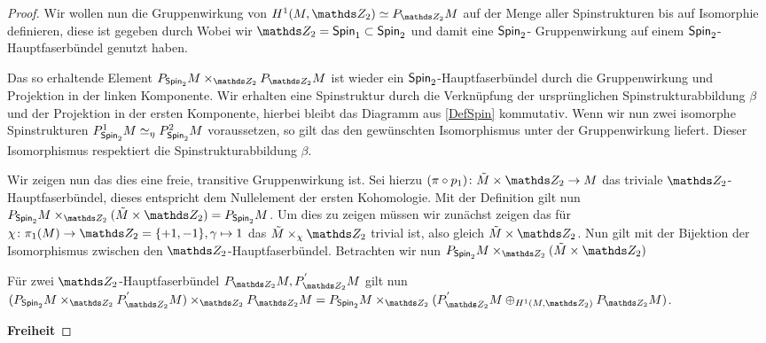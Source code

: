 \begin{Satz}
\begin{proof}
		Wir wollen nun die Gruppenwirkung von $ H^1(M,\Z_2)\simeq \Ph{\Z_2}{M} $ auf der Menge aller Spinstrukturen bis auf Isomorphie definieren,
		diese ist gegeben durch
		Wobei wir $ \Z_2=\spin_1\subset\spin_2 $ und damit eine $ \operatorname{\mathsf{Spin}}_2 $-
		Gruppenwirkung auf einem $ \operatorname{\mathsf{Spin}}_2 $-Hauptfaserbündel genutzt haben.

		Das so erhaltende Element $ \Ph{\spin_2}{M}\times_{\Z_2} \Ph{\Z_2}{M} $ ist wieder ein $ \operatorname{\mathsf{Spin}}_2 $-Hauptfaserbündel
		durch die Gruppenwirkung und Projektion in der linken Komponente. Wir erhalten eine Spinstruktur durch die
		Verknüpfung der ursprünglichen Spinstrukturabbildung $ \beta $
		und der Projektion in der ersten Komponente, hierbei bleibt
		das Diagramm aus \cref{DefSpin} kommutativ.
		Wenn wir nun zwei isomorphe Spinstrukturen $ P^1_{\operatorname{\mathsf{Spin}}_2}{M} \simeq_\eta P^2_{\operatorname{\mathsf{Spin}}_2}{M}$ voraussetzen, so gilt das
		den gewünschten Isomorphismus unter der Gruppenwirkung liefert. Dieser Isomorphismus respektiert die Spinstrukturabbildung $ \beta $.
		
		Wir zeigen nun das dies eine freie, transitive Gruppenwirkung ist. Sei hierzu $ \abb{(\pi\circ p_1)}{\tilde{M}\times \Z_2}{M} $ das triviale $ \Z_2 $-Hauptfaserbündel, dieses entspricht dem Nullelement der ersten Kohomologie. Mit der Definition gilt nun
		$ \Ph{\spin_2}{M} \times_{\Z_2} (\tilde{M} \times \Z_2) = \Ph{\spin_2}{M} $. Um dies zu zeigen müssen wir zunächst
		zeigen das für $ \abb{\chi}{\pi_1(M)}{\Z_2 = \{ +1,-1 \}} , \gamma \mapsto 1 $ das $ \tilde{M} \times_\chi \Z_2 $ trivial ist, also gleich $ \tilde{M} \times \Z_2 $. Nun gilt 
		mit der Bijektion 
		der Isomorphismus zwischen den $ \Z_2 $-Hauptfaserbündel.
		Betrachten wir nun $ \Ph{\spin_2}{M} \times_{\Z_2} (\tilde{M} \times \Z_2) $
		
		Für zwei $ \Z_2 $-Hauptfaserbündel $ \Ph{\Z_2}{M},P^{'}_{\Z_2}M $
		gilt nun $ ( \Ph{\spin_2}{M} \times_{\Z_2} P^{'}_{\Z_2}M ) \times_{\Z_2} \Ph{\Z_2}{M} = \Ph{\spin_2}{M} \times_{\Z_2} (P^{'}_{\Z_2}M \oplus_{H^1(M,\Z_2)} \Ph{\Z_2}{M}) $.
		
		\textbf{Freiheit}
		

\end{proof}
\end{Satz}
